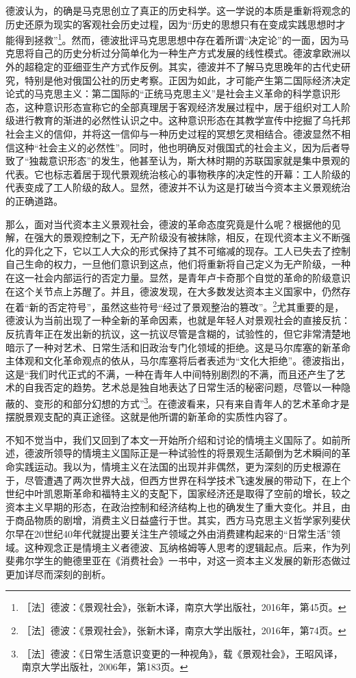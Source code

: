 \documentclass[fontset=fandol, a4paper, 12pt, openright]{ctexbook}
\begin{document}
德波认为，的确是马克思创立了真正的历史科学。这一学说的本质是重新将观念的历史还原为现实的客观社会历史过程，因为“历史的思想只有在变成实践思想时才能得到拯救”\footnote{［法］德波：《景观社会》，张新木译，南京大学出版社，2016年，第45页。}。然而，德波批评马克思思想中存在着所谓“决定论”的一面，因为马克思将自己的历史分析过分简单化为一种生产方式发展的线性模式。德波拿欧洲以外的超稳定的亚细亚生产方式作反例。其实，德波并不了解马克思晚年的古代史研究，特别是他对俄国公社的历史考察。正因为如此，才可能产生第二国际经济决定论式的马克思主义：第二国际的“正统马克思主义”是社会主义革命的科学意识形态，这种意识形态宣称它的全部真理居于客观经济发展过程中，居于组织对工人阶级进行教育的渐进的必然性认识之中。这种意识形态在其教学宣传中挖掘了乌托邦社会主义的信仰，并将这一信仰与一种历史过程的冥想乞灵相结合。德波显然不相信这种“社会主义的必然性”。同时，他也明确反对俄国式的社会主义，因为后者导致了“独裁意识形态”的发生，他甚至认为，斯大林时期的苏联国家就是集中景观的代表。它也标志着居于现代景观统治核心的事物秩序的决定性的开幕：工人阶级的代表变成了工人阶级的敌人。显然，德波并不认为这是打破当今资本主义景观统治的正确道路。

那么，面对当代资本主义景观社会，德波的革命态度究竟是什么呢？根据他的见解，在强大的景观控制之下，无产阶级没有被抹除，相反，在现代资本主义不断强化的异化之下，它以工人大众的形式保持了其不可缩减的现存。工人已失去了控制自己生命的权力，一旦他们意识到这点，他们将重新将自己定义为无产阶级，一种在这一社会内部运行的否定力量。显然，是青年卢卡奇那个自觉的革命的阶级意识在这个关节点上苏醒了。并且，德波发现，在大多数发达资本主义国家中，仍然存在着“新的否定符号”，虽然这些符号“经过了景观整治的篡改”。\footnote{［法］德波：《景观社会》，张新木译，南京大学出版社，2016年，第74页。}尤其重要的是，德波认为当前出现了一种全新的革命因素，也就是年轻人对景观社会的直接反抗：反抗青年正在发出新的抗议，这一抗议尽管是含糊的，试验性的，但它非常清楚地暗示了一种对艺术、日常生活和旧政治专门化领域的拒绝。这是马尔库塞的新革命主体观和文化革命观点的依从，马尔库塞将后者表述为“文化大拒绝”。德波指出，这是“我们时代正式的不满，一种在青年人中间特别剧烈的不满，而且还产生了艺术的自我否定的趋势。艺术总是独自地表达了日常生活的秘密问题，尽管以一种隐蔽的、变形的和部分幻想的方式”\footnote{［法］德波：《日常生活意识变更的一种视角》，载《景观社会》，王昭风译，南京大学出版社，2006年，第183页。}。在德波看来，只有来自青年人的艺术革命才是摆脱景观支配的真正途径。这就是他所谓的新革命的实质性内容了。

不知不觉当中，我们又回到了本文一开始所介绍和讨论的情境主义国际了。如前所述，德波所领导的情境主义国际正是一种试验性的将景观生活颠倒为艺术瞬间的革命实践运动。我以为，情境主义在法国的出现并非偶然，更为深刻的历史根源在于，尽管遭遇了两次世界大战，但西方世界在科学技术飞速发展的带动下，在上个世纪中叶凯恩斯革命和福特主义的支配下，国家经济还是取得了空前的增长，较之资本主义早期的形态，在政治控制和经济结构上也的确发生了重大变化。并且，由于商品物质的剧增，消费主义日益盛行于世。其实，西方马克思主义哲学家列斐伏尔早在20世纪40年代就提出要关注生产领域之外由消费建构起来的“日常生活”领域。这种观念正是情境主义者德波、瓦纳格姆等人思考的逻辑起点。后来，作为列斐弗尔学生的鲍德里亚在《消费社会》一书中，对这一资本主义发展的新形态做过更加详尽而深刻的剖析。
\end{document}
